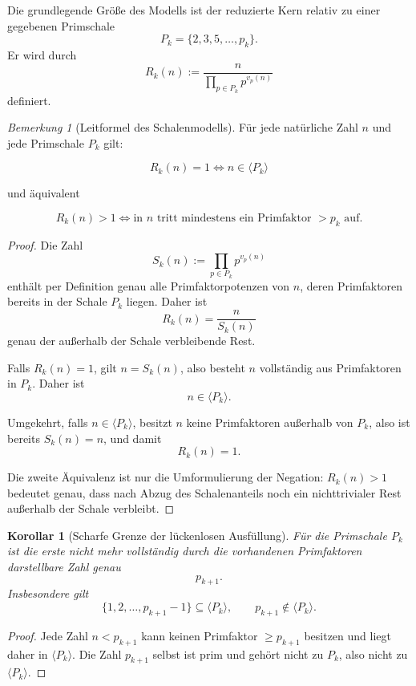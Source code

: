 \documentclass[11pt,a4paper]{article}
\newtheorem{korollar}[satz]{Korollar}
\theoremstyle{definition}
\theoremstyle{remark}
\newtheorem{bemerkung}[satz]{Bemerkung}
\begin{document}
	Die grundlegende Größe des Modells ist der reduzierte Kern relativ zu einer gegebenen
	Primschale
	\[
	P_k=\{2,3,5,\dots,p_k\}.
	\]
	Er wird durch
	\[
	\boxed{
		R_k(n):=\frac{n}{\displaystyle\prod_{p\in P_k} p^{v_p(n)}}
	}
	\]
	definiert.
	
	\begin{bemerkung}[Leitformel des Schalenmodells]
		\label{prop:leitformel_schale}
		Für jede natürliche Zahl \(n\) und jede Primschale \(P_k\) gilt:
		
		\[
		\boxed{
			R_k(n)=1
			\iff
			n\in \langle P_k\rangle
		}
		\]
		
		und äquivalent
		
		\[
		\boxed{
			R_k(n)>1
			\iff
			\text{in }n\text{ tritt mindestens ein Primfaktor }>p_k\text{ auf.}
		}
		\]
	\end{bemerkung}
	
	\begin{proof}
		Die Zahl
		\[
		S_k(n):=\prod_{p\in P_k} p^{v_p(n)}
		\]
		enthält per Definition genau alle Primfaktorpotenzen von \(n\), deren Primfaktoren bereits
		in der Schale \(P_k\) liegen. Daher ist
		\[
		R_k(n)=\frac{n}{S_k(n)}
		\]
		genau der außerhalb der Schale verbleibende Rest.
		
		\medskip
		\noindent
		Falls \(R_k(n)=1\), gilt \(n=S_k(n)\), also besteht \(n\) vollständig aus Primfaktoren in
		\(P_k\). Daher ist
		\[
		n\in \langle P_k\rangle.
		\]
		
		Umgekehrt, falls \(n\in \langle P_k\rangle\), besitzt \(n\) keine Primfaktoren außerhalb
		von \(P_k\), also ist bereits \(S_k(n)=n\), und damit
		\[
		R_k(n)=1.
		\]
		
		Die zweite Äquivalenz ist nur die Umformulierung der Negation: \(R_k(n)>1\) bedeutet
		genau, dass nach Abzug des Schalenanteils noch ein nichttrivialer Rest außerhalb der
		Schale verbleibt.
	\end{proof}
	
	\begin{korollar}[Scharfe Grenze der lückenlosen Ausfüllung]
		\label{kor:leitformel_grenze}
		Für die Primschale \(P_k\) ist die erste nicht mehr vollständig durch die vorhandenen
		Primfaktoren darstellbare Zahl genau
		\[
		p_{k+1}.
		\]
		Insbesondere gilt
		\[
		\{1,2,\dots,p_{k+1}-1\}\subseteq \langle P_k\rangle,
		\qquad
		p_{k+1}\notin \langle P_k\rangle.
		\]
	\end{korollar}
	
	\begin{proof}
		Jede Zahl \(n<p_{k+1}\) kann keinen Primfaktor \(\ge p_{k+1}\) besitzen und liegt daher
		in \(\langle P_k\rangle\). Die Zahl \(p_{k+1}\) selbst ist prim und gehört nicht zu
		\(P_k\), also nicht zu \(\langle P_k\rangle\).
	\end{proof}
	
\end{document}
